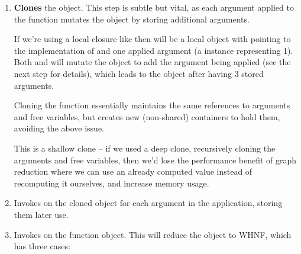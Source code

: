 \documentclass[dissertation.tex]{subfiles}
\begin{document}
{{{\begin{enumerate}
{                Fetches the function, either by calling the appropriate  function with the free
                variables, or just loading a local variable if the function has already been partially applied and
                stored or passed as a function argument.

            }
            \item
            {

                \textbf{Clones} the  object. This step is subtle but vital, as each argument applied
                to the function mutates the  object by storing additional arguments.
                
                If we're using a local closure like  then
                 will be a local  object with  pointing to the
                implementation of \haskell{(+)} and one applied argument (a  instance representing 1).
                Both  and  will mutate the object to add the argument being applied
                (see the next step for details), which leads to the  object after 
                having 3 stored arguments.

                Cloning the function essentially maintains the same references to arguments and free variables, but
                creates new (non-shared) containers to hold them, avoiding the above issue.
                
                This is a shallow clone -- if we used a deep clone, recursively cloning the arguments and free
                variables, then we'd lose the performance benefit of graph reduction where we can use an already
                computed value instead of recomputing it ourselves, and increase memory usage.

            }
            \item
            {

                Invokes  on the cloned object for each argument in the application, storing them
                later use.

            }
            \item
            {

                Invokes  on the function object. This will reduce the object to WHNF, which has three
                cases:
                
}
\end{enumerate}}}}
\end{document}
